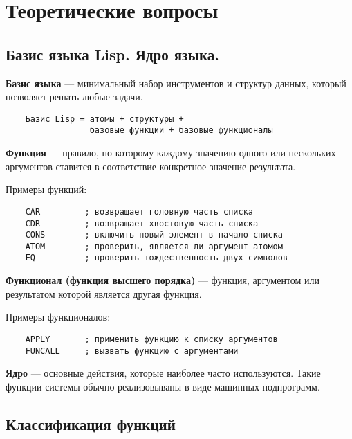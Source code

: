 \chapter{Теоретические вопросы}

\section{Базис языка Lisp. Ядро языка.}

\textbf{Базис языка} --- минимальный набор инструментов и структур данных, который позволяет решать любые задачи.

\begin{lstlisting}
    Базис Lisp = атомы + структуры + 
                 базовые функции + базовые функционалы
\end{lstlisting}

\textbf{Функция} --- правило, по которому каждому значению одного или нескольких аргументов ставится в соответствие конкретное значение результата.

Примеры функций:
\begin{lstlisting}
    CAR         ; возвращает головную часть списка
    CDR         ; возвращает хвостовую часть списка
    CONS        ; включить новый элемент в начало списка
    ATOM        ; проверить, является ли аргумент атомом
    EQ          ; проверить тождественность двух символов
\end{lstlisting}

\textbf{Функционал (функция высшего порядка)} --- функция, аргументом или результатом которой является другая функция.

Примеры функционалов:
\begin{lstlisting}
    APPLY       ; применить функцию к списку аргументов
    FUNCALL     ; вызвать функцию с аргументами
\end{lstlisting} 

\textbf{Ядро} --- основные действия, которые наиболее часто используются. Такие функции системы обычно реализовываны в виде машинных подпрограмм.


\section{Классификация функций}

